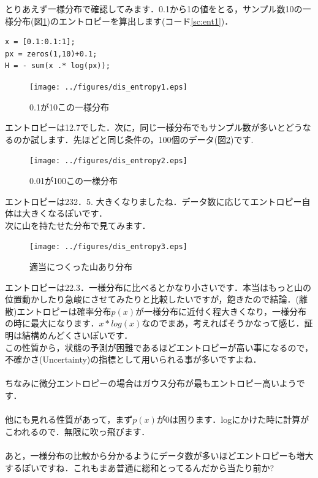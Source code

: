 \documentclass[11pt,a4paper,uplatex]{ujreport}
\begin{document}
とりあえず一様分布で確認してみます．0.1から1の値をとる，サンプル数10の一様分布(図\ref{im:ent1})のエントロピーを算出します(コード\ref{sc:ent1})．
\begin{lstlisting}[caption=エントロピーの計算,label=sc:ent1]
x = [0.1:0.1:1];
px = zeros(1,10)+0.1;
H = - sum(x .* log(px));

\end{lstlisting}

\begin{figure}[H]
\label{im:ent1}
  \centering
  \texttt{[image: ../figures/dis\_entropy1.eps]}
  \caption{0.1が10この一様分布}
\end{figure}

エントロピーは12.7でした．次に，同じ一様分布でもサンプル数が多いとどうなるのか試します．先ほどと同じ条件の，100個のデータ(図\ref{im:ent2})です.

\begin{figure}[H]
\label{im:ent2}
  \centering
  \texttt{[image: ../figures/dis\_entropy2.eps]}
  \caption{0.01が100この一様分布}
\end{figure}

エントロピーは232．5. 大きくなりましたね．データ数に応じてエントロピー自体は大きくなるぽいです．\\
次に山を持たせた分布で見てみます．

\begin{figure}[H]
\label{im:ent3}
  \centering
  \texttt{[image: ../figures/dis\_entropy3.eps]}
  \caption{適当につくった山あり分布}
\end{figure}

エントロピーは22.3．一様分布に比べるとかなり小さいです．本当はもっと山の位置動かしたり急峻にさせてみたりと比較したいですが，飽きたので結論．(離散)エントロピーは確率分布$p(x)$が一様分布に近付く程大きくなり，一様分布の時に最大になります．$x * log(x)$なのでまあ，考えればそうかなって感じ．証明は結構めんどくさいぽいです．\\
この性質から，状態の予測が困難であるほどエントロピーが高い事になるので，不確かさ(Uncertainty)の指標として用いられる事が多いですよね．\\
\\
ちなみに微分エントロピーの場合はガウス分布が最もエントロピー高いようです．\\
\\
他にも見れる性質があって，まず$p(x)$が0は困ります．logにかけた時に計算がこわれるので．無限に吹っ飛びます．\\
\\
あと，一様分布の比較から分かるようにデータ数が多いほどエントロピーも増大するぽいですね．これもまあ普通に総和とってるんだから当たり前か?
\end{document}
